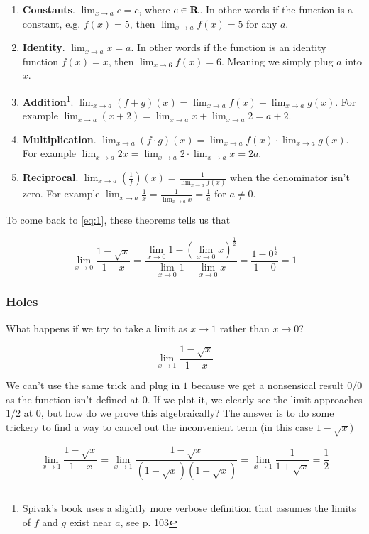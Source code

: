 \begin{enumerate}
\item \textbf{Constants}. $\lim_{x\to a}c=c$, where $c\in\mathbf{R}$. In other
  words if the function is a constant, e.g. $f(x)=5$, then
  $\lim_{x\to a}f(x)=5$ for any $a$.
\item \textbf{Identity}. $\lim_{x\to a}x=a$. In other words if the
  function is an identity function $f(x)=x$, then
  $\lim_{x\to 6}f(x)=6$. Meaning we simply plug $a$ into $x$.
\item \textbf{Addition}\footnote{Spivak's book uses a slightly more
    verbose definition that assumes the limits of $f$ and $g$ exist
    near $a$, see p. 103}.
  $\lim_{x\to a}(f+g)(x)=\lim_{x\to a}f(x)+\lim_{x\to a}g(x)$. For example
  $\lim_{x\to a}(x+2)=\lim_{x\to a}x+\lim_{x\to a}2=a+2$.
\item \textbf{Multiplication}.
  $\lim_{x\to a}(f\cdot g)(x)=\lim_{x\to a}f(x)\cdot \lim_{x\to a}g(x)$. For example
  $\lim_{x\to a}2x=\lim_{x\to a}2\cdot \lim_{x\to a}x=2a$.
\item \textbf{Reciprocal}.
  $\lim_{x\to a}\left(\frac{1}{f}\right)(x)=\frac{1}{\lim_{x\to a}f(x)}$
  when the denominator isn't zero. For example
  $\lim_{x\to a}\frac{1}{x}=\frac{1}{\lim_{x\to a}x}=\frac{1}{a}$ for
  $a\neq0$.
\end{enumerate}

To come back to \ref{eq:1}, these theorems tells us that

\[\lim_{x\to 0}\frac{1-\sqrt{x}}{1-x}=\frac{\lim_{x\to 0}1-(\lim_{x\to 0}x)^{\frac{1}{2}}}{\lim_{x\to 0}1-\lim_{x\to 0}x}=\frac{1-0^{\frac{1}{2}}}{1-0}=1\]

\subsubsection*{Holes}

What happens if we try to take a limit as $x\to 1$ rather than $x\to 0$?

\[\lim_{x\to 1}\frac{1-\sqrt{x}}{1-x}\]

We can't use the same trick and plug in $1$ because we get a
nonsensical result $0/0$ as the function isn't defined at $0$. If we
plot it, we clearly see the limit approaches $1/2$ at $0$, but how do
we prove this algebraically? The answer is to do some trickery to find
a way to cancel out the inconvenient term (in this case $1-\sqrt{x}$)

\[\lim_{x\to 1}\frac{1-\sqrt{x}}{1-x}=\lim_{x\to 1}\frac{1-\sqrt{x}}{(1-\sqrt{x})(1+\sqrt{x})}=\lim_{x\to 1}\frac{1}{1+\sqrt{x}}=\frac{1}{2}\]

